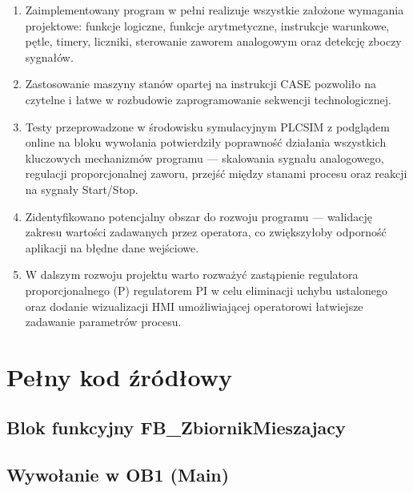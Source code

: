 \documentclass[12pt,a4paper]{report}
\begin{document}
\begin{enumerate}
    \item Zaimplementowany program w pełni realizuje wszystkie założone wymagania projektowe: funkcje logiczne, funkcje arytmetyczne, instrukcje warunkowe, pętle, timery, liczniki, sterowanie zaworem analogowym oraz detekcję zboczy sygnałów.
    \item Zastosowanie maszyny stanów opartej na instrukcji CASE pozwoliło na czytelne i łatwe w rozbudowie zaprogramowanie sekwencji technologicznej.
    \item Testy przeprowadzone w środowisku symulacyjnym PLCSIM z podglądem online na bloku wywołania potwierdziły poprawność działania wszystkich kluczowych mechanizmów programu — skalowania sygnału analogowego, regulacji proporcjonalnej zaworu, przejść między stanami procesu oraz reakcji na sygnały Start/Stop.
    \item Zidentyfikowano potencjalny obszar do rozwoju programu — walidację zakresu wartości zadawanych przez operatora, co zwiększyłoby odporność aplikacji na błędne dane wejściowe.
    \item W dalszym rozwoju projektu warto rozważyć zastąpienie regulatora proporcjonalnego (P) regulatorem PI w celu eliminacji uchybu ustalonego oraz dodanie wizualizacji HMI umożliwiającej operatorowi łatwiejsze zadawanie parametrów procesu.
\end{enumerate}

\appendix
\chapter{Pełny kod źródłowy}

\section{Blok funkcyjny FB\_ZbiornikMieszajacy}


\section{Wywołanie w OB1 (Main)}

\end{document}
